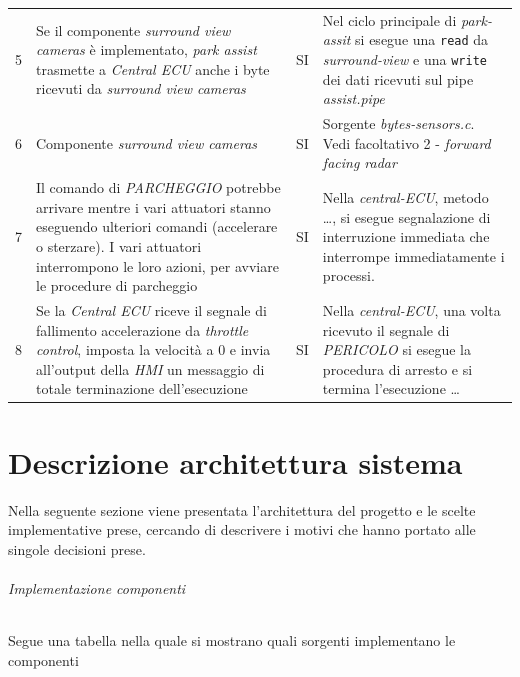 \documentclass[11pt, openany]{article}
\theoremstyle{definition}
\theoremstyle{plain}
\theoremstyle{remark}
\begin{document}
\begin{tcolorbox}[width=\textwidth,colback={Cornsilk2}]
\begin{tabularx}{\textwidth}{lXcX}
					5	&	Se il componente \textit{surround view cameras} è implementato, \textit{park assist} trasmette a \textit{Central ECU} anche i byte ricevuti da \textit{surround view cameras}	&	SI	&	Nel ciclo principale di \textit{park-assit} si esegue una \texttt{read} da \textit{surround-view} e una \texttt{write} dei dati ricevuti sul pipe \textit{assist.pipe} \\\vspace{0.1cm}
					6	&	Componente \textit{surround view cameras}	&	SI	&	Sorgente \textit{bytes-sensors.c}. Vedi facoltativo 2 - \textit{forward facing radar}	\\\vspace{0.1cm}
					7	&	Il comando di \textit{PARCHEGGIO} potrebbe arrivare mentre i vari attuatori stanno eseguendo ulteriori comandi (accelerare o sterzare). I vari attuatori interrompono le loro azioni, per avviare le procedure di parcheggio	&	SI	&	Nella \textit{central-ECU}, metodo \dots, si esegue segnalazione di interruzione immediata che interrompe immediatamente i processi.\\
					8	&	Se la \textit{Central ECU }riceve il segnale di fallimento accelerazione da \textit{throttle control}, imposta la velocità a 0 e invia all'output della \textit{HMI} un messaggio di totale terminazione dell'esecuzione	&	SI	&	Nella \textit{central-ECU}, una volta ricevuto il segnale di \textit{PERICOLO} si esegue la procedura di arresto e si termina l'esecuzione \dots
				\end{tabularx}
				\label{tab:facoltativi}
			\end{tcolorbox}

	\part{Descrizione architettura sistema}
		Nella seguente sezione viene presentata l'architettura del progetto e le scelte implementative prese, cercando di descrivere i motivi che hanno portato alle singole decisioni prese.

		\paragraph{Implementazione componenti}
			\footnotesize Segue una tabella nella quale si mostrano quali sorgenti implementano le componenti
			\normalsize
\end{document}
